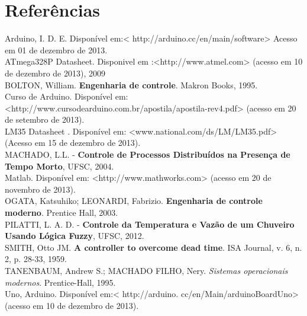 \chapter{Referências}

Arduino, I. D. E. Disponível em:< http://arduino.cc/en/main/software> Acesso em 01 de dezembro de 2013.\\

ATmega328P Datasheet. Disponivel em :<http://www.atmel.com> (acesso em 10 de dezembro de 2013), 2009\\

BOLTON, William. \textbf{Engenharia de controle}. Makron Books, 1995.\\

Curso de Arduino. Disponível em: <http://www.cursodearduino.com.br/apostila/apostila-rev4.pdf> (acesso em 20 de setembro de 2013).\\

LM35 Datasheet . Disponível em:
<www.national.com/ds/LM/LM35.pdf> (Acesso em 15 de dezembro de 2013).\\

MACHADO, L.L. - \textbf{Controle de Processos Distribuídos na Presença de Tempo Morto}, UFSC, 2004.\\

Matlab. Disponível em: <http://www.mathworks.com> (acesso em 20 de novembro de 2013).\\

OGATA, Katsuhiko; LEONARDI, Fabrizio. \textbf{Engenharia de controle moderno}. Prentice Hall, 2003.\\

PILATTI, L. A. D. - \textbf{Controle da Temperatura e Vazão de 
um Chuveiro Usando Lógica Fuzzy}, UFSC, 2012.\\

SMITH, Otto JM. \textbf{A controller to overcome dead time}. ISA Journal, v. 6, n. 2, p. 28-33, 1959.\\

TANENBAUM, Andrew S.; MACHADO FILHO, Nery. \textit{Sistemas operacionais modernos}. Prentice-Hall, 1995.\\

Uno, Arduino. Disponível em:< http://arduino. cc/en/Main/arduinoBoardUno> (acesso em 10 de dezembro de 2013).\\
